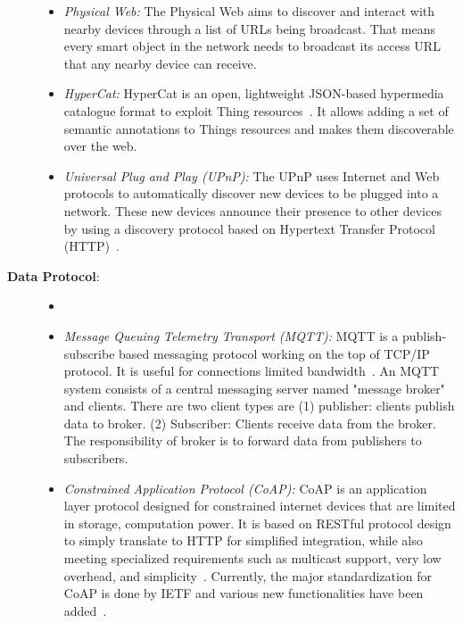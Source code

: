 \begin{description}
\begin{itemize}
    \item \textit{Physical Web: } The Physical Web aims to discover and interact with nearby devices through a list of URLs being broadcast. That means every smart object in the network needs to broadcast its access URL that any nearby device can receive. 
    
    \item \textit{HyperCat: } HyperCat is an open, lightweight JSON-based hypermedia catalogue format to exploit Thing resources~\cite{HyperCat76:online}. It allows adding a set of semantic annotations to Things resources and makes them discoverable over the web. 
    
    \item \textit{Universal Plug and Play (UPnP): } The UPnP uses Internet and Web protocols to automatically discover new devices to be plugged into a network. These new devices announce their presence to other devices by using a discovery protocol based on Hypertext Transfer Protocol (HTTP)~\cite{RFC6970U68:online}. 
    
    
    \end{itemize}

\item[\textbf{Data Protocol}:\\]
    \begin{itemize}
    \item[] 
    \item \textit{Message Queuing Telemetry Transport (MQTT): } MQTT  is a publish-subscribe based messaging protocol working on the top of TCP/IP protocol. It is useful for connections limited bandwidth~\cite{}. An MQTT system consists of a central messaging server named "message broker" and clients. There are two client types are (1) publisher: clients publish data to broker. (2) Subscriber: Clients receive data from the broker. The responsibility of broker is to forward data from publishers to subscribers. 
    
    \item \textit{Constrained Application Protocol (CoAP): } CoAP  is an application layer protocol designed for constrained internet devices that are limited in storage, computation power. It is based on RESTful protocol design to simply translate to HTTP for simplified integration, while also meeting specialized requirements such as multicast support, very low overhead, and simplicity~\cite{RFC7252T93:online}. Currently, the major standardization for CoAP is done by IETF and various new functionalities have been added~\cite{colitti2011integrating}. 
    

\end{itemize}
\end{description}
